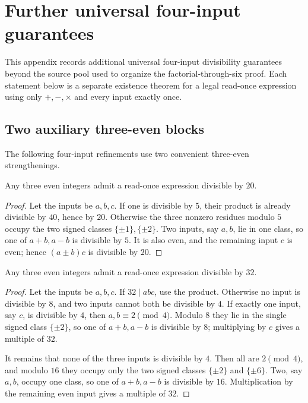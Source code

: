 \section{Further universal four-input guarantees}\label{app:four-refinements}

This appendix records additional universal four-input divisibility guarantees
beyond the source pool used to organize the factorial-through-six proof.  Each
statement below is a separate existence theorem for a legal read-once
expression using only $+,-,\times$ and every input exactly once.

\subsection{Two auxiliary three-even blocks}\label{app:three-even-new}

The following four-input refinements use two convenient three-even strengthenings.

\begin{lemma}\label{lem:three-even20}
Any three even integers admit a read-once expression divisible by $20$.
\end{lemma}
\begin{proof}
Let the inputs be $a,b,c$.  If one is divisible by $5$, their product is
already divisible by $40$, hence by $20$.  Otherwise the three
nonzero residues modulo $5$ occupy the two signed classes
$\{\pm1\},\{\pm2\}$.  Two inputs, say $a,b$, lie in one class, so one of
$a+b,a-b$ is divisible by $5$.  It is also even, and the remaining input $c$
is even; hence $(a\pm b)c$ is divisible by $20$.
\end{proof}

\begin{lemma}\label{lem:three-even32}
Any three even integers admit a read-once expression divisible by $32$.
\end{lemma}
\begin{proof}
Let the inputs be $a,b,c$.  If $32\mid abc$, use the product.  Otherwise no
input is divisible by $8$, and two inputs cannot both be divisible by $4$.
If exactly one input, say $c$, is divisible by $4$, then $a,b\equiv2\pmod4$.
Modulo $8$ they lie in the single signed class $\{\pm2\}$, so one of
$a+b,a-b$ is divisible by $8$; multiplying by $c$ gives a multiple of $32$.

It remains that none of the three inputs is divisible by $4$.  Then all are
$2\pmod4$, and modulo $16$ they occupy only the two signed classes
$\{\pm2\}$ and $\{\pm6\}$.  Two, say $a,b$, occupy one class, so one of
$a+b,a-b$ is divisible by $16$.  Multiplication by the remaining even input
gives a multiple of $32$.
\end{proof}

